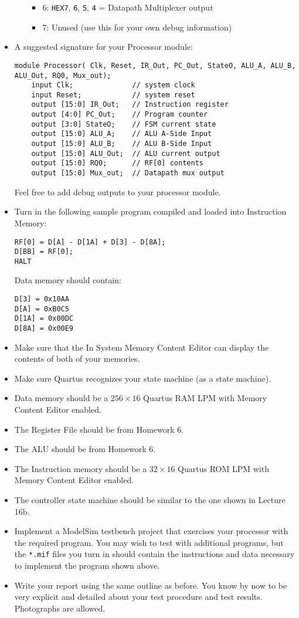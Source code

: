\begin{itemize}
\begin{itemize}
\begin{itemize}
            \item 6: \verb|HEX7|, \verb|6|, \verb|5|, \verb|4| = Datapath Multiplexer output
            \item 7: Unused (use this for your own debug information)
        \end{itemize}
    \end{itemize}
    \item A suggested signature for your Processor module:
    \begin{lstlisting}
module Processor( Clk, Reset, IR_Out, PC_Out, StateO, ALU_A, ALU_B, ALU_Out, RQ0, Mux_out);
    input Clk;              // system clock
    input Reset;            // system reset
    output [15:0] IR_Out;   // Instruction register
    output [4:0] PC_Out;    // Program counter
    output [3:0] StateO;    // FSM current state
    output [15:0] ALU_A;    // ALU A-Side Input
    output [15:0] ALU_B;    // ALU B-Side Input
    output [15:0] ALU_Out;  // ALU current output
    output [15:0] RQ0;      // RF[0] contents
    output [15:0] Mux_out;  // Datapath mux output
    \end{lstlisting}
    Feel free to add debug outputs to your processor module.
    \item Turn in the following sample program compiled and loaded into Instruction Memory:
    \begin{lstlisting}
RF[0] = D[A] - D[1A] + D[3] - D[8A];
D[BB] = RF[0];
HALT
    \end{lstlisting}
    Data memory should contain:
    \begin{lstlisting}
D[3] = 0x10AA
D[A] = 0xB0C5
D[1A] = 0x00DC
D[8A] = 0x00E9
    \end{lstlisting}
    \item Make sure that the In System Memory Content Editor can display the contents of both of your memories.
    \item Make sure Quartus recognizes your state machine (as a state machine).
    \item Data memory should be a $256 \times 16$ Quartus RAM LPM with Memory Content Editor enabled.
    \item The Register File should be from Homework 6.
    \item The ALU should be from Homework 6.
    \item The Instruction memory should be a $32 \times  16$ Quartus ROM LPM with Memory Content Editor enabled.
    \item The controller state machine should be similar to the one shown in Lecture 16b.
    \item Implement a ModelSim testbench project that exercises your processor with the required program. You may wish to test with additional programs, but the \verb|*.mif| files you turn in should contain the instructions and data necessary to implement the program shown above.
    \item Write your report using the same outline as before.
    You know by now to be very explicit and detailed about your test procedure and test results.
    Photographs are allowed.
\end{itemize}